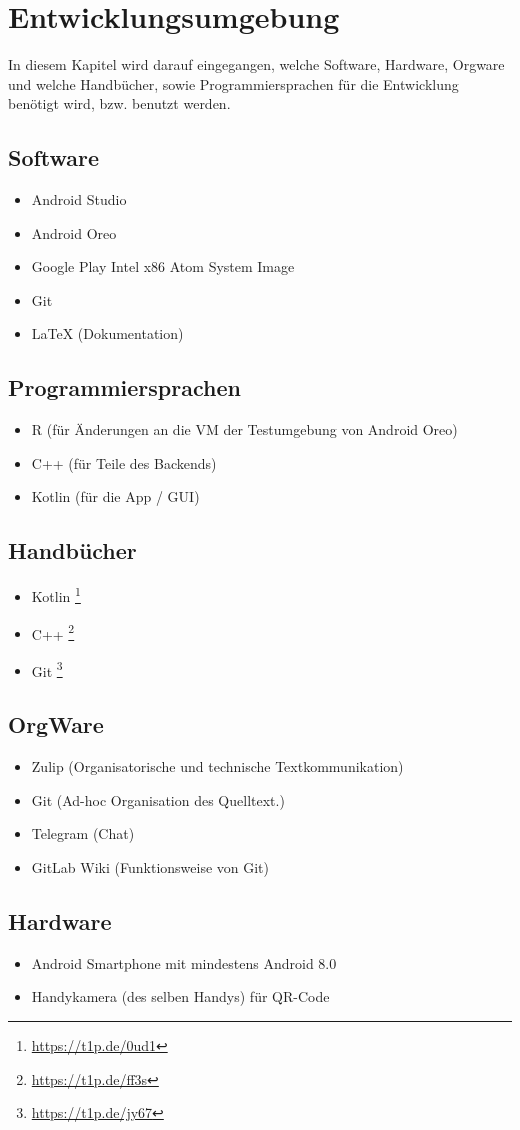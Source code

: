 \section{Entwicklungsumgebung}
In diesem Kapitel wird darauf eingegangen, welche Software, Hardware, Orgware und welche Handbücher, sowie Programmiersprachen für die Entwicklung benötigt wird, bzw. benutzt werden.

\subsection{Software}
\begin{itemize}
	\item Android Studio
	\item Android Oreo
	\item Google Play Intel x86 Atom System Image
	\item Git
	\item LaTeX (Dokumentation) 
\end{itemize}

\subsection{Programmiersprachen}
\begin{itemize}
	\item R (für Änderungen an die \ac{VM} der Testumgebung von Android Oreo)
	\item C++ (für Teile des Backends)
	\item Kotlin (für die App / GUI)
\end{itemize}

\subsection{Handbücher}
\begin{itemize}
	\item Kotlin \footnote{\url{https://t1p.de/0ud1}}
	\item C++  \footnote{\url{https://t1p.de/ff3s}}
	\item Git \footnote{\url{https://t1p.de/jy67}}
\end{itemize}

\subsection{OrgWare}
\begin{itemize}
	\item Zulip (Organisatorische und technische Textkommunikation)
	\item Git (Ad-hoc Organisation des Quelltext.)
	\item Telegram (Chat)
	\item GitLab Wiki (Funktionsweise von Git)

\end{itemize}


\subsection{Hardware}
\label{sec:Hardware}
\begin{itemize}
	\item Android Smartphone mit mindestens Android 8.0		
	\item Handykamera (des selben Handys) für QR-Code
\end{itemize} 